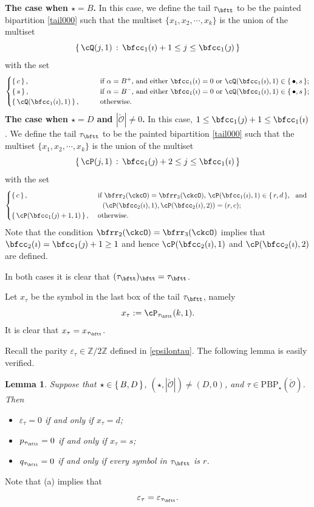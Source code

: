 \documentclass[11pt,a4paper]{amsart}
\def\abs#1{\left|{#1}\right|}
\newcommand{\CO}{{\mathcal {O}}}
\newcommand{\Z}{\mathbb{Z}}
\newcommand{\be}{\begin {equation}}
\newcommand{\ee}{\end {equation}}
\numberwithin{equation}{section}
\newtheorem{lem}[thm]{Lemma}
\theoremstyle{remark}
\begin{document}
{\bf The case when $\star = B$.}
In this case, we define the tail $\tau_\bftt$ to be the  painted bipartition  \eqref{tail000} such that the multiset $\{x_1, x_2, \cdots, x_k\}$ is the
union of the multiset
\[
  \set{\cQ(j,1)\,:\, \bfcc_{1}(\imath)+1 \leq j \leq  \bfcc_{1}(\jmath) }
\]
with the set
\[
  \begin{cases}
 \set{c}, &
 \qquad
  \text{if $\alpha = B^+$, and either $\bfcc_{1}(\imath)=0$ or $\cQ(\bfcc_{1}(\imath),1)\in \set{\bullet,s}$};  \\
 \set{s},&
  \qquad \text{if $\alpha = B^-$, and either $\bfcc_{1}(\imath)=0$ or $\cQ(\bfcc_{1}(\imath),1)\in \set{\bullet,s}$}; \\
\set{\cQ(\bfcc_{1}(\imath),1)},&
\qquad
\text{otherwise.}
\end{cases}
\]
{\bf The case when $\star = D$ and $\abs{\check \CO}\neq 0$.}
In this case, $1\leq \bfcc_1(\jmath)+1\leq \bfcc_1(\imath)$.  We define the tail $\tau_\bftt$ to be the  painted
bipartition  \eqref{tail000} such that the multiset $\{x_1, x_2, \cdots, x_k\}$
is the union of the multiset
\[
\set{\cP(j,1)\,:\, \bfcc_{1}(\jmath)+2 \leq j \leq \bfcc_{1}(\imath)}
\]
with the set
\[
\begin{cases}
    \set{c},                          &
    \ \text{if $\bfrr_2(\ckcO)=\bfrr_3(\ckcO)$, $\cP(\bfcc_1(\imath),1)\in \set{r,d}$}, \  \text{ and }                                   \\
     & \quad   (\cP(\bfcc_{2}(\imath),1) ,\cP(\bfcc_{2}(\imath),2)) = (r,c);  \\
    \set{\cP(\bfcc_{1}(\jmath)+1,1)}, &
    \    \text{otherwise.}
  \end{cases}
\]
Note that the condition $\bfrr_2(\ckcO)=\bfrr_3(\ckcO)$ implies that $ \bfcc_2(\imath)=\bfcc_{1}(\jmath)+1\geq 1 $ and hence $\cP(\bfcc_{2}(\imath),1)$ and $\cP(\bfcc_{2}(\imath),2)$ are defined. 



In both cases it is clear that $(\tau_\bftt)_\bftt=\tau_\bftt$.

Let $x_{\tau}$ be the symbol in the last box of the tail $\tau_\bftt$, namely 
\be\label{xtau}
x_\tau := \cP_{\tau_\bftt}(k,1).
\ee
It is clear that $x_\tau=x_{\tau_\bftt}$.

Recall the parity $\varepsilon_\tau\in \Z/2\Z$ defined in \eqref{epsilontau}. The following  lemma is  easily verified. 

\begin{lem}\label{eptail}
Suppose that $\star \in \set{B,D}$, $(\star, \abs{\check \CO})\neq (D, 0)$, and  $\tau\in
\mathrm{PBP}_\star(\check \CO)$. Then \begin{itemize}
    \item $\varepsilon_\tau=0$ if and only if $x_\tau=d$;
    \item $p_{\tau_\bftt}=0$ if and only if $x_\tau=s$;
    \item $q_{\tau_\bftt}=0$ if and only if every symbol in $\tau_\bftt$ is $r$.
\end{itemize}
\end{lem}
 Note that  (a) implies that  \[
 \varepsilon_\tau=\varepsilon_{\tau_\bftt}.
 \]
\end{document}
